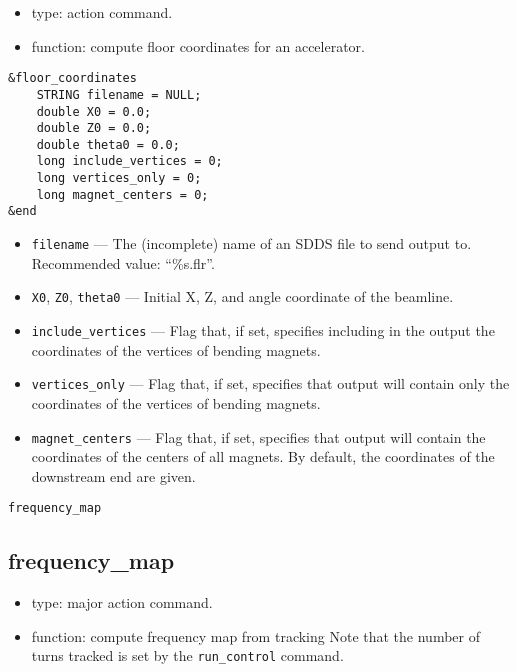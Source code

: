 \documentclass[11pt]{article}
\begin{document}
\begin{itemize}
\item type: action command.
\item function: compute floor coordinates for an accelerator.
\end{itemize}

\begin{verbatim}
&floor_coordinates
    STRING filename = NULL;
    double X0 = 0.0;
    double Z0 = 0.0;
    double theta0 = 0.0;
    long include_vertices = 0;
    long vertices_only = 0;
    long magnet_centers = 0;
&end
\end{verbatim}

\begin{itemize}
\item \verb|filename| --- The (incomplete) name of an SDDS file to send output to.  
 Recommended value: ``\%s.flr''.
\item \verb|X0|, \verb|Z0|, \verb|theta0| --- Initial X, Z, and angle coordinate of the beamline.
\item \verb|include_vertices| --- Flag that, if set, specifies including  in the output
the coordinates of the vertices of bending magnets.
\item \verb|vertices_only| --- Flag that, if set, specifies that output will contain only
the coordinates of the vertices of bending magnets.
\item \verb|magnet_centers| --- Flag that, if set, specifies that output will contain 
the coordinates of the centers of all magnets.  By default, the coordinates of the downstream
end are given.
\end{itemize}

\begin{latexonly}
\newpage
\begin{center}{\Large\verb|frequency_map|}\end{center}
\end{latexonly}
\subsection{frequency\_map \label{subsec:frequencymap}}

\begin{itemize}
\item type: major action command.  
\item function: compute frequency map from tracking
      Note that the number of turns tracked is set by the \verb|run_control| command.
\end{itemize}
\end{document}
